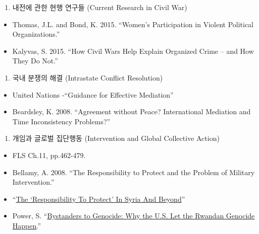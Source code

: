 \documentclass[]{book}
\providecommand{\tightlist}{%
  \setlength{\itemsep}{0pt}\setlength{\parskip}{0pt}}
\begin{document}
\begin{enumerate}
\def\labelenumi{\arabic{enumi}.}
\setcounter{enumi}{10}
\tightlist
\item
  내전에 관한 현행 연구들 (Current Research in Civil War)
\end{enumerate}

\begin{itemize}
\tightlist
\item
  Thomas, J.L. and Bond, K. 2015. ``Women's Participation in Violent Political Organizations.''
\item
  Kalyvas, S. 2015. ``How Civil Wars Help Explain Organized Crime -- and How They Do Not.''
\end{itemize}

\begin{enumerate}
\def\labelenumi{\arabic{enumi}.}
\setcounter{enumi}{11}
\tightlist
\item
  국내 분쟁의 해결 (Intrastate Conflict Resolution)
\end{enumerate}

\begin{itemize}
\tightlist
\item
  United Nations -``Guidance for Effective Mediation''
\item
  Beardsley, K. 2008. ``Agreement without Peace? International Mediation and Time Inconsistency Problems?''
\end{itemize}

\begin{enumerate}
\def\labelenumi{\arabic{enumi}.}
\setcounter{enumi}{12}
\tightlist
\item
  개임과 글로벌 집단행동 (Intervention and Global Collective Action)
\end{enumerate}

\begin{itemize}
\tightlist
\item
  FLS Ch.11, pp.462-479.
\item
  Bellamy, A. 2008. ``The Responsibility to Protect and the Problem of Military Intervention.''
\item
  ``\href{https://www.npr.org/2012/02/06/146474734/the-worlds-responsibility-to-protect}{The `Responsibility To Protect' In Syria And Beyond}''
\item
  Power, S. ``\href{https://www.theatlantic.com/magazine/archive/2001/09/bystanders-to-genocide/304571/}{Bystanders to Genocide: Why the
  U.S. Let the Rwandan Genocide Happen}.''
\end{itemize}
\end{document}
